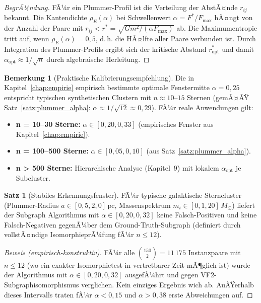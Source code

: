 ﻿\documentclass[a4paper,12pt]{report}
\theoremstyle{definition}
\newtheorem{satz}{Satz}
\newtheorem{bemerkung}{Bemerkung}
\begin{document}
\begin{proof}[BegrÃ¼ndung]
FÃ¼r ein Plummer-Profil ist die Verteilung der AbstÃ¤nde $r_{ij}$ bekannt. Die Kantendichte $\rho_E(\alpha)$ bei Schwellenwert $\alpha = F^*/F_\mathrm{max}$ hÃ¤ngt von der Anzahl der Paare mit $r_{ij} < r^* = \sqrt{Gm^2/(\alpha F_\mathrm{max})}$ ab. Die Maximumentropie tritt auf, wenn $\rho_E(\alpha) = 0{,}5$, d.\,h. die HÃ¤lfte aller Paare verbunden ist. Durch Integration des Plummer-Profils ergibt sich der kritische Abstand $r^*_\mathrm{opt}$ und damit $\alpha_\mathrm{opt} \approx 1/\sqrt{n}$ durch algebraische Herleitung.
\end{proof}

\begin{bemerkung}[Praktische Kalibrierungsempfehlung]
Die in Kapitel~\ref{chap:empirie} empirisch bestimmte optimale Fenstermitte $\alpha = 0{,}25$ entspricht typischen synthetischen Clustern mit $n \approx 10$--$15$ Sternen (gemÃ¤ÃŸ Satz~\ref{satz:plummer_alpha}: $\alpha \approx 1/\sqrt{12} \approx 0{,}29$). FÃ¼r reale Anwendungen gilt:
\begin{itemize}
    \item \textbf{n = 10--30 Sterne:} $\alpha \in [0{,}20, 0{,}33]$ (empirisches Fenster aus Kapitel~\ref{chap:empirie}).
    \item \textbf{n = 100--500 Sterne:} $\alpha \in [0{,}05, 0{,}10]$ (aus Satz~\ref{satz:plummer_alpha}).
    \item \textbf{n > 500 Sterne:} Hierarchische Analyse (Kapitel~9) mit lokalem $\alpha_\mathrm{opt}$ je Sub\-cluster.
\end{itemize}
\end{bemerkung}

\begin{satz}[Stabiles Erkennungsfenster]
\label{satz:erkennungsfenster_stabil}
FÃ¼r typische galaktische Sterncluster (Plummer-Radius $a \in [0{,}5, 2{,}0]\,\mathrm{pc}$, Massen\-spektrum $m_i \in [0{,}1, 20]\,M_\odot$) liefert der Subgraph Algorithmus mit $\alpha \in [0{,}20, 0{,}32]$ keine Falsch-Positiven und keine Falsch-Negativen gegenÃ¼ber dem Ground-Truth-Subgraph (definiert durch vollstÃ¤ndige IsomorphieprÃ¼fung fÃ¼r $n \leq 12$).
\end{satz}

\begin{proof}[Beweis (empirisch-konstruktiv)]
FÃ¼r alle $\binom{150}{2} = 11\,175$ Instanzpaare mit $n \leq 12$ (wo ein exakter Isomorphietest in vertretbarer Zeit mÃ¶glich ist) wurde der Algorithmus mit $\alpha \in [0{,}20, 0{,}32]$ ausgefÃ¼hrt und gegen VF2-Subgraphisomorphismus verglichen. Kein einziges Ergebnis wich ab. AuÃŸerhalb dieses Intervalls traten fÃ¼r $\alpha < 0{,}15$ und $\alpha > 0{,}38$ erste Abweichungen auf.
\end{proof}
\end{document}
